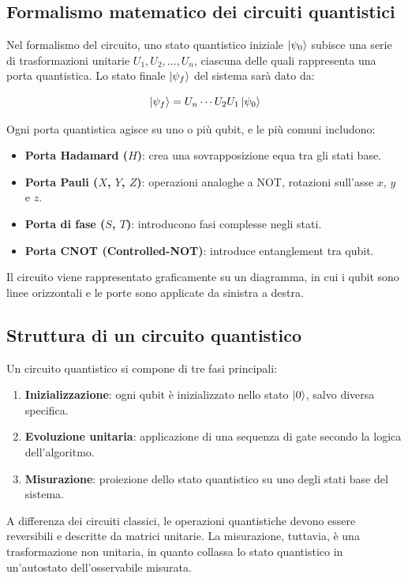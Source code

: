 \documentclass[a4paper,12pt]{report}
\theoremstyle{plain}
\begin{document}
\subsection{Formalismo matematico dei circuiti quantistici}

Nel formalismo del circuito, uno stato quantistico iniziale $\ket{\psi_0}$ subisce una serie di trasformazioni unitarie $U_1, U_2, \dots, U_n$, ciascuna delle quali rappresenta una porta quantistica. Lo stato finale $\ket{\psi_f}$ del sistema sarà dato da:

\[
\ket{\psi_f} = U_n \cdots U_2 U_1 \ket{\psi_0}
\]

Ogni porta quantistica agisce su uno o più qubit, e le più comuni includono:

\begin{itemize}
  \item \textbf{Porta Hadamard ($H$)}: crea una sovrapposizione equa tra gli stati base.
  \item \textbf{Porta Pauli ($X$, $Y$, $Z$)}: operazioni analoghe a NOT, rotazioni sull'asse $x$, $y$ e $z$.
  \item \textbf{Porta di fase ($S$, $T$)}: introducono fasi complesse negli stati.
  \item \textbf{Porta CNOT (Controlled-NOT)}: introduce entanglement tra qubit.
\end{itemize}

Il circuito viene rappresentato graficamente su un diagramma, in cui i qubit sono linee orizzontali e le porte sono applicate da sinistra a destra.

\subsection{Struttura di un circuito quantistico}

Un circuito quantistico si compone di tre fasi principali:

\begin{enumerate}
  \item \textbf{Inizializzazione}: ogni qubit è inizializzato nello stato $\ket{0}$, salvo diversa specifica.
  \item \textbf{Evoluzione unitaria}: applicazione di una sequenza di gate secondo la logica dell’algoritmo.
  \item \textbf{Misurazione}: proiezione dello stato quantistico su uno degli stati base del sistema.
\end{enumerate}

A differenza dei circuiti classici, le operazioni quantistiche devono essere reversibili e descritte da matrici unitarie. La misurazione, tuttavia, è una trasformazione non unitaria, in quanto collassa lo stato quantistico in un'autostato dell'osservabile misurata.
\end{document}
